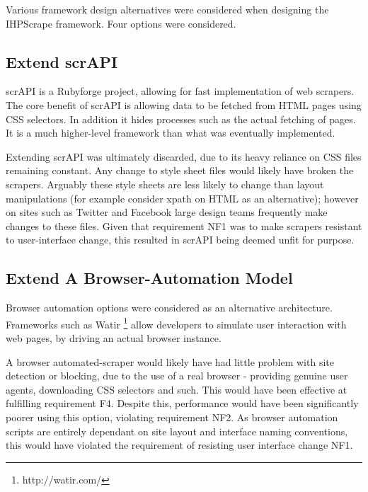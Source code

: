 Various framework design alternatives were considered when designing the IHPScrape framework. Four options were considered.

% 

\subsection{Extend scrAPI}
scrAPI is a Rubyforge project, allowing for fast implementation of web scrapers. The core benefit of scrAPI is allowing data to be fetched from HTML pages using CSS selectors. In addition it hides processes such as the actual fetching of pages. It is a much higher-level framework than what was eventually implemented.

Extending scrAPI was ultimately discarded, due to its heavy reliance on CSS files remaining constant. Any change to style sheet files would likely have broken the scrapers. Arguably these style sheets are less likely to change than layout manipulations (for example consider xpath on HTML as an alternative); however on sites such as Twitter and Facebook large design teams frequently make changes to these files. Given that requirement NF1 was to make scrapers resistant to user-interface change, this resulted in scrAPI being deemed unfit for purpose. 

\subsection{Extend A Browser-Automation Model}

Browser automation options were considered as an alternative architecture. Frameworks such as Watir \footnote{http://watir.com/} allow developers to simulate user interaction with web pages, by driving an actual browser instance.

A browser automated-scraper would likely have had little problem with site detection or blocking, due to the use of a real browser - providing genuine user agents, downloading CSS selectors and such. This would have been effective at fulfilling requirement F4. Despite this, performance would have been significantly poorer using this option, violating requirement NF2. As browser automation scripts are entirely dependant on site layout and interface naming conventions, this would have violated the requirement of resisting user interface change NF1. 

